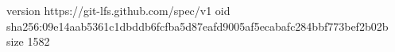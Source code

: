 version https://git-lfs.github.com/spec/v1
oid sha256:09e14aab5361c1dbddb6fcfba5d87eafd9005af5ecabafc284bbf773bef2b02b
size 1582
